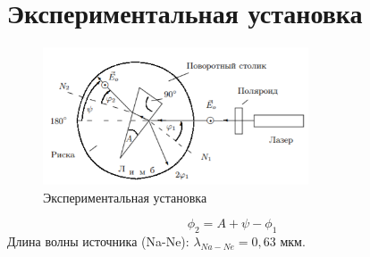 \documentclass[a4paper, 12pt]{article}%
\begin{document}
\section*{Экспериментальная установка}

\begin{figure}[h]
\begin{center}
\includegraphics[width = 0.7\textwidth]{2.png}
\caption{Экспериментальная установка}
\end{center}
\end{figure}
\begin{equation}
\phi_2 = A + \psi - \phi_1
\end{equation}
Длина волны источника (Na-Ne): $\lambda_{Na-Ne} = 0,63$ мкм.
\end{document}
